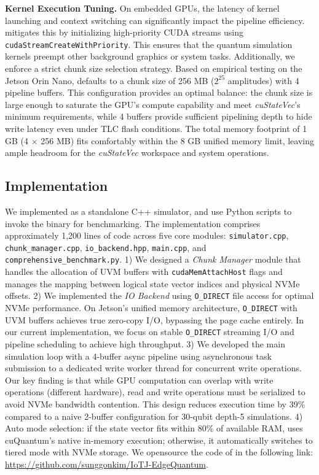 \noindent\textbf{Kernel Execution Tuning.}
On embedded GPUs, the latency of kernel launching and context switching can significantly impact the pipeline efficiency.
\EdgeQuantum mitigates this by initializing high-priority CUDA streams using \texttt{cudaStreamCreateWithPriority}.
This ensures that the quantum simulation kernels preempt other background graphics or system tasks.
Additionally, we enforce a strict chunk size selection strategy.
Based on empirical testing on the Jetson Orin Nano, \EdgeQuantum defaults to a chunk size of 256 MB ($2^{25}$ amplitudes) with 4 pipeline buffers.
This configuration provides an optimal balance: the chunk size is large enough to saturate the GPU's compute capability and meet \textit{cuStateVec}'s minimum requirements, while 4 buffers provide sufficient pipelining depth to hide write latency even under TLC flash conditions.
The total memory footprint of 1 GB (4 $\times$ 256 MB) fits comfortably within the 8 GB unified memory limit, leaving ample headroom for the \textit{cuStateVec} workspace and system operations.

\subsection{\EdgeQuantum Implementation}

We implemented \EdgeQuantum as a standalone C++ simulator, and use Python scripts to invoke the binary for benchmarking.
The implementation comprises approximately 1,200 lines of code across five core modules: \texttt{simulator.cpp}, \texttt{chunk\_manager.cpp}, \texttt{io\_backend.hpp}, \texttt{main.cpp}, and \texttt{comprehensive\_benchmark.py}.
1) We designed a \textit{Chunk Manager} module that handles the allocation of UVM buffers with \texttt{cudaMemAttachHost} flags and manages the mapping between logical state vector indices and physical NVMe offsets.
2) We implemented the \textit{IO Backend} using \texttt{O\_DIRECT} file access for optimal NVMe performance.
On Jetson's unified memory architecture, \texttt{O\_DIRECT} with UVM buffers achieves true zero-copy I/O, bypassing the page cache entirely.
In our current implementation, we focus on stable \texttt{O\_DIRECT} streaming I/O and pipeline scheduling to achieve high throughput.
3) We developed the main simulation loop with a 4-buffer async pipeline using asynchronous task submission to a dedicated write worker thread for concurrent write operations.
Our key finding is that while GPU computation can overlap with write operations (different hardware), read and write operations must be serialized to avoid NVMe bandwidth contention.
This design reduces execution time by 39\% compared to a naive 2-buffer configuration for 30-qubit depth-5 simulations.
4) Auto mode selection: if the state vector fits within 80\% of available RAM, \EdgeQuantum uses cuQuantum's native in-memory execution; otherwise, it automatically switches to tiered mode with NVMe storage.
We opensource the code of \EdgeQuantum in the following link: \url{https://github.com/sunggonkim/IoTJ-EdgeQuantum}.
